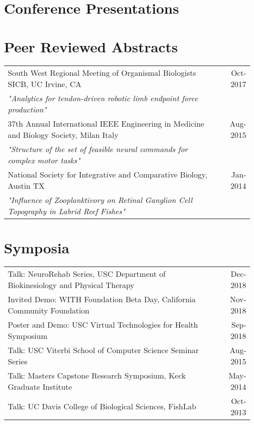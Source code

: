 \documentclass[10pt,a4paper]{article}
\begin{document}
\newpage
  \vspace*{2mm}\section*{\textbf{Conference Presentations}}

  \vspace*{2mm}\section*{Peer Reviewed Abstracts}

  \vspace*{1mm}\noindent\begin{tabularx}{17cm}{X r}
    
	  South West Regional Meeting of Organismal Biologists SICB, UC Irvine, CA & Oct-2017 \\ %
    \textit{"Analytics for tendon-driven robotic limb endpoint force production"}\\[2mm]
    37th Annual International IEEE Engineering in Medicine and Biology Society, Milan Italy & Aug-2015 \\  %
    \textit{"Structure of the set of feasible neural commands for complex motor tasks"}\\[2mm]
    National Society for Integrative and Comparative Biology, Austin TX & Jan-2014 \\  %
    \textit{"Influence of Zooplanktivory on Retinal Ganglion Cell Topography in Labrid Reef Fishes"}\\[2mm]
  \end{tabularx}

  \vspace*{2mm}\section*{Symposia}

  \vspace*{1mm}\noindent\begin{tabularx}{17cm}{X r}
  Talk: NeuroRehab Series, USC Department of Biokinesiology and Physical Therapy & Dec-2018\\%
    Invited Demo: WITH Foundation Beta Day, California Community Foundation & Nov-2018\\
    Poster and Demo: USC Virtual Technologies for Health Symposium & Sep-2018 \\
    Talk: USC Viterbi School of Computer Science Seminar Series & Aug-2015 \\
    Talk: Masters Capstone Research Symposium, Keck Graduate Institute & May-2014 \\
    Talk: UC Davis College of Biological Sciences, FishLab & Oct-2013 \\
  \end{tabularx}
\end{document}
